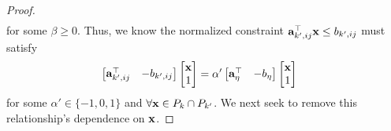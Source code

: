 \begin{proof}
\begin{subequations}
\begin{align}
\end{align}
\end{subequations}
for some $\beta \ge 0$. Thus, we know the normalized constraint $\mathbf{a}_{k',ij}^\top \mathbf{x} \le b_{k',ij}$ must satisfy
\begin{align}
    \begin{bmatrix} \multicolumn{2}{c}{\ba_{k',ij}^\top} & -b_{k',ij} \end{bmatrix}  \begin{bmatrix} \bx \\ 1 \end{bmatrix} &=  
    \alpha' \begin{bmatrix} \ba^\top_\eta & -b_\eta \end{bmatrix} 
    \begin{bmatrix} \bx \\ 1 \end{bmatrix} \label{eq:x_depend}
\end{align}
for some $\alpha' \in \{-1,0,1\}$ and $\forall \mathbf{x} \in P_k \cap P_{k'}$. We next seek to remove this relationship's dependence on $\mathbf{x}$.


\end{proof}
